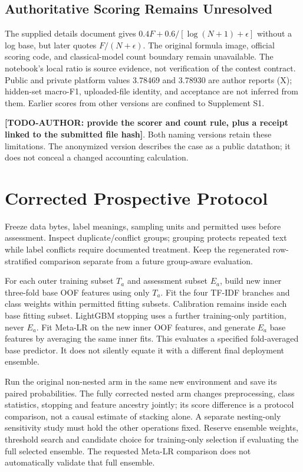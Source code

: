 \documentclass[doublecolumn]{ijcvsplatex}
\newcommand{\AuthorTodo}[1]{\textbf{[TODO-AUTHOR:\allowbreak{} #1]}}
\begin{document}
\subsection{Authoritative Scoring Remains Unresolved}
The supplied details document gives $0.4F+0.6/[\log(N+1)+\epsilon]$ without a log base, but later quotes $F/(N+\epsilon)$. The original formula image, official scoring code, and classical-model count boundary remain unavailable. The notebook's local ratio is source evidence, not verification of the contest contract. Public and private platform values 3.78469 and 3.78930 are author reports (X); hidden-set macro-F1, uploaded-file identity, and acceptance are not inferred from them. Earlier scores from other versions are confined to Supplement S1.

\AuthorTodo{provide the scorer and count rule, plus a receipt linked to the submitted file hash}. Both naming versions retain these limitations. The anonymized version describes the case as a public datathon; it does not conceal a changed accounting calculation.

\section{Corrected Prospective Protocol}
\label{sec:discussion}
Freeze data bytes, label meanings, sampling units and permitted uses before assessment. Inspect duplicate/conflict groups; grouping protects repeated text while label conflicts require documented treatment. Keep the regenerated row-stratified comparison separate from a future group-aware evaluation.

For each outer training subset $T_a$ and assessment subset $E_a$, build new inner three-fold base OOF features using only $T_a$. Fit the four TF-IDF branches and class weights within permitted fitting subsets. Calibration remains inside each base fitting subset. LightGBM stopping uses a further training-only partition, never $E_a$. Fit Meta-LR on the new inner OOF features, and generate $E_a$ base features by averaging the same inner fits. This evaluates a specified fold-averaged base predictor. It does not silently equate it with a different final deployment ensemble.

Run the original non-nested arm in the same new environment and save its paired probabilities. The fully corrected nested arm changes preprocessing, class statistics, stopping and feature ancestry jointly; its score difference is a protocol comparison, not a causal estimate of stacking alone. A separate nesting-only sensitivity study must hold the other operations fixed. Reserve ensemble weights, threshold search and candidate choice for training-only selection if evaluating the full selected ensemble. The requested Meta-LR comparison does not automatically validate that full ensemble.
\end{document}
